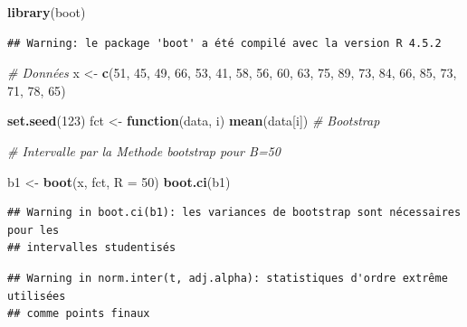 \documentclass[
]{article}
\newenvironment{Shaded}{\begin{snugshade}}{\end{snugshade}}
\newcommand{\AttributeTok}[1]{\textcolor[rgb]{0.13,0.29,0.53}{#1}}
\newcommand{\CommentTok}[1]{\textcolor[rgb]{0.56,0.35,0.01}{\textit{#1}}}
\newcommand{\ControlFlowTok}[1]{\textcolor[rgb]{0.13,0.29,0.53}{\textbf{#1}}}
\newcommand{\DecValTok}[1]{\textcolor[rgb]{0.00,0.00,0.81}{#1}}
\newcommand{\FunctionTok}[1]{\textcolor[rgb]{0.13,0.29,0.53}{\textbf{#1}}}
\newcommand{\NormalTok}[1]{#1}
\newcommand{\OtherTok}[1]{\textcolor[rgb]{0.56,0.35,0.01}{#1}}
\begin{document}
\begin{Shaded}
\begin{Highlighting}[]
\FunctionTok{library}\NormalTok{(boot) }
\end{Highlighting}
\end{Shaded}

\begin{verbatim}
## Warning: le package 'boot' a été compilé avec la version R 4.5.2
\end{verbatim}

\begin{Shaded}
\begin{Highlighting}[]
\CommentTok{\# Données }
\NormalTok{x }\OtherTok{\textless{}{-}} \FunctionTok{c}\NormalTok{(}\DecValTok{51}\NormalTok{, }\DecValTok{45}\NormalTok{, }\DecValTok{49}\NormalTok{, }\DecValTok{66}\NormalTok{, }\DecValTok{53}\NormalTok{, }\DecValTok{41}\NormalTok{, }\DecValTok{58}\NormalTok{, }\DecValTok{56}\NormalTok{, }\DecValTok{60}\NormalTok{, }\DecValTok{63}\NormalTok{, }\DecValTok{75}\NormalTok{, }\DecValTok{89}\NormalTok{, }\DecValTok{73}\NormalTok{, }\DecValTok{84}\NormalTok{, }\DecValTok{66}\NormalTok{, }\DecValTok{85}\NormalTok{, }\DecValTok{73}\NormalTok{, }\DecValTok{71}\NormalTok{, }\DecValTok{78}\NormalTok{, }\DecValTok{65}\NormalTok{) }

\FunctionTok{set.seed}\NormalTok{(}\DecValTok{123}\NormalTok{)}
\NormalTok{fct }\OtherTok{\textless{}{-}} \ControlFlowTok{function}\NormalTok{(data, i) }\FunctionTok{mean}\NormalTok{(data[i]) }\CommentTok{\# Bootstrap}
\end{Highlighting}
\end{Shaded}

\begin{Shaded}
\begin{Highlighting}[]
 \CommentTok{\#  Intervalle par la Methode bootstrap pour B=50}

\NormalTok{b1 }\OtherTok{\textless{}{-}} \FunctionTok{boot}\NormalTok{(x, fct, }\AttributeTok{R =} \DecValTok{50}\NormalTok{)}
\FunctionTok{boot.ci}\NormalTok{(b1)}
\end{Highlighting}
\end{Shaded}

\begin{verbatim}
## Warning in boot.ci(b1): les variances de bootstrap sont nécessaires pour les
## intervalles studentisés
\end{verbatim}

\begin{verbatim}
## Warning in norm.inter(t, adj.alpha): statistiques d'ordre extrême utilisées
## comme points finaux
\end{verbatim}
\end{document}
